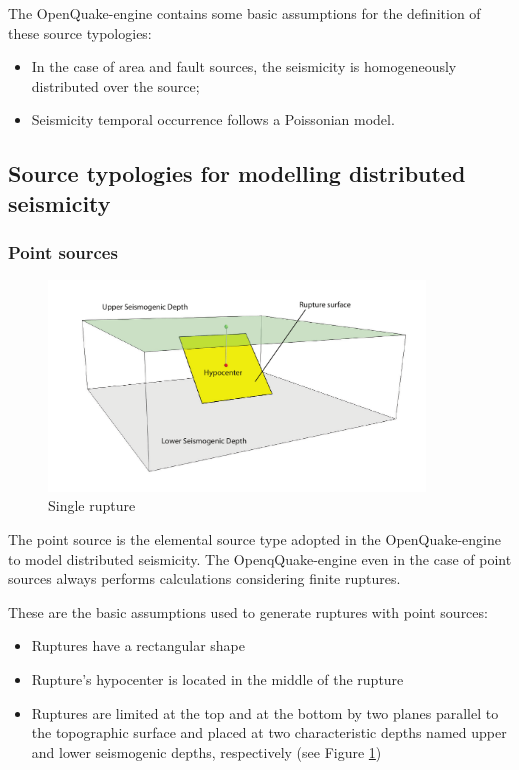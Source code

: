 The OpenQuake-engine contains some basic assumptions for the 
definition of these source typologies:
\begin{itemize}
	\item In the case of area and fault sources, the seismicity 
        is homogeneously distributed over the source; 	
	\item Seismicity temporal occurrence follows a Poissonian model. 
\end{itemize}
\subsection{Source typologies for modelling distributed seismicity}
\subsubsection{Point sources}
\label{hazard:seismic_source_types:pointSources}
\begin{figure}[!ht]
\centering
\includegraphics[width=10cm]{./figures/hazard/single_rupture.pdf}
\caption{Single rupture}
\label{fig:single_rupture}
\end{figure}
The point source is the elemental source type adopted in the OpenQuake-engine 
to model distributed seismicity. The OpenqQuake-engine even in the case of 
point sources always performs calculations considering finite ruptures.

These are the basic assumptions used to generate ruptures with point 
sources:
%
\begin{itemize}
	\item Ruptures have a rectangular shape
	\item Rupture's hypocenter is located in the middle of the rupture
	\item Ruptures are limited at the top and at the bottom by two planes 
	parallel to the topographic surface and placed at two characteristic 
	depths named upper and lower seismogenic depths, respectively (see 
	Figure \ref{fig:single_rupture})
\end{itemize} 
%
